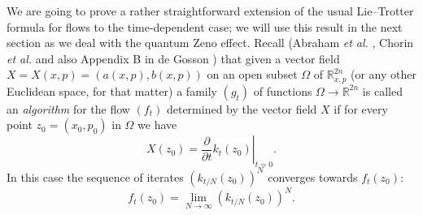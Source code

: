 \documentclass[12pt]{article}%
\begin{document}
We are going to prove a rather straightforward extension of the usual
Lie--Trotter \cite{Trotter} formula for flows to the time-dependent case; we
will use this result in the next section as we deal with the quantum Zeno
effect. Recall (Abraham \emph{et al.} \cite{AMR}, Chorin \emph{et al.}
\cite{chorinetal} and also Appendix B in de Gosson \cite{ICP}) that given a
vector field $X=X(x,p)=(a(x,p),b(x,p))$ on an open subset $\Omega$ of
$\mathbb{R}_{x,p}^{2n}$ (or any other Euclidean space, for that matter) a
family $(g_{t})$ of functions $\Omega\longrightarrow\mathbb{R}^{2n}$ is called
an \emph{algorithm} for the flow $(f_{t})$ determined by the vector field $X$
if for every point $z_{0}=(x_{0},p_{0})$ in $\Omega$ we have
\begin{equation}
X(z_{0})=\left.  \frac{\partial}{\partial t}k_{t}(z_{0})\right\vert _{t=0}.
\label{xz}%
\end{equation}
In this case the sequence of iterates $(k_{t/N}(z_{0}))^{N}$ converges towards
$f_{t}(z_{0})$:
\begin{equation}
f_{t}(z_{0})=\lim_{N\rightarrow\infty}(k_{t/N}(z_{0}))^{N}. \label{lt1}%
\end{equation}
\end{document}

